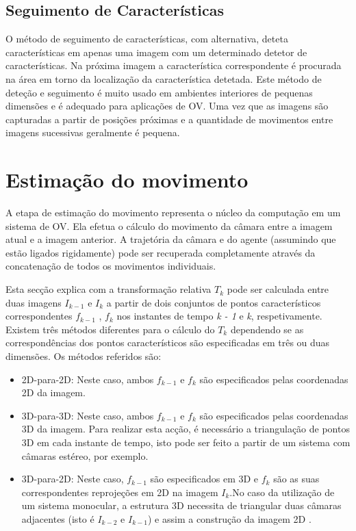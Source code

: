 \subsection{Seguimento de Características}

O método de seguimento de características, com alternativa, deteta características em apenas uma imagem com um determinado detetor de características. Na próxima imagem a característica correspondente é procurada na área em torno da localização da característica detetada.
Este método de deteção e seguimento é muito usado em ambientes interiores de pequenas dimensões e é adequado para aplicações de OV. 
Uma vez que as imagens são capturadas a partir de posições próximas e a quantidade de movimentos entre imagens sucessivas geralmente é pequena. 


\section{Estimação do movimento}

A etapa de estimação do movimento representa o núcleo da computação em um sistema de OV. Ela efetua o cálculo do movimento da câmara entre a imagem atual e a imagem anterior. A trajetória da câmara e do agente (assumindo que estão ligados rigidamente) pode ser recuperada completamente através da concatenação de todos os movimentos individuais.

Esta secção explica com a transformação relativa \textit{$T_k$} pode ser calculada entre duas imagens \textit{$I_{k-1}$} e \textit{$I_k$} a partir de dois conjuntos de pontos característicos correspondentes \textit{$f_{k-1}$} , \textit{$f_k$} nos instantes de tempo \textit{k - 1} e \textit{k}, respetivamente. Existem três métodos diferentes para o cálculo do \textit{$T_k$} dependendo se as correspondências dos pontos característicos são especificadas em três ou duas dimensões. Os métodos referidos são:


\begin{itemize}
	\item 2D-para-2D: Neste caso, ambos \textit{$f_{k-1}$} e \textit{$f_k$} são especificados pelas coordenadas 2D da imagem.
	\item 3D-para-3D: Neste caso, ambos \textit{$f_{k-1}$} e \textit{$f_k$} são especificados pelas coordenadas 3D da imagem. Para realizar esta acção, é necessário a triangulação de pontos 3D em cada instante de tempo, isto pode ser feito a partir de um sistema com câmaras estéreo, por exemplo.
	\item 3D-para-2D: Neste caso, \textit{$f_{k-1}$} são especificados em 3D e \textit{$f_k$} são as suas correspondentes reprojeções em 2D na imagem \textit{$I_k$}.No caso da utilização de um sistema monocular, a estrutura 3D necessita de triangular duas câmaras adjacentes (isto é \textit{$I_{k-2}$} e \textit{$I_{k-1}$}) e assim a construção da imagem 2D . 
\end{itemize}



